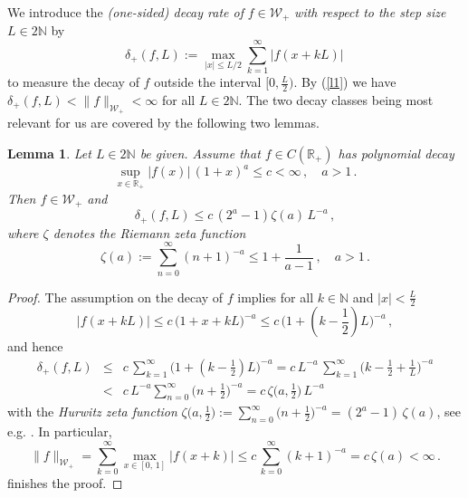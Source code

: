 \documentclass[11pt,a4paper]{scrartcl}
\newtheorem{lemma}[theorem]{Lemma}
\numberwithin{equation}{section}
\numberwithin{table}{section}
\numberwithin{figure}{section}
\newcommand{\N}{\mathbb N}
\newcommand{\Rp}{{\mathbb R}_{+}}
\newcommand{\Wp}{{\mathcal W}_{+}}
\newcommand{\dpl}{\delta_{+}}
\begin{document}
\noindent
We introduce
the \emph{(one-sided) decay rate of}  $f \in \Wp$
\emph{with respect to the step size} $L \in 2\N$ by
\begin{equation}
\label{eq:decayrate+}
\textstyle \dpl(f,L) := \max\limits_{|x| \leq L/2} \sum\limits_{k = 1}^{\infty} |f(x + k L)|\,
\end{equation}
to measure the decay of $f$ outside the interval $[0, \frac{L}{2})$.
By (\ref{l1}) we have $\dpl(f,L) < \|f\|_{\Wp} < \infty$ for all $L \in 2{\mathbb N}$.
The two decay
classes being most relevant for us are covered by the following two lemmas.

\begin{lemma}
	\label{Lemma:polydecay}
	Let $L \in 2\N$ be given. Assume that $f \in C(\Rp)$ has \emph{polynomial
	decay}
	$$
	\textstyle \sup\limits_{x \in \Rp} |f(x)|\,(1 + x)^a \leq c < \infty\,,
	\quad a > 1\,.
	$$
	Then $f \in \Wp$ and
	\begin{equation}
		\label{eq:deltapoly}
	\textstyle	\dpl(f,L) \leq c\,(2^a - 1)\zeta(a)\,L^{-a}\,,
	\end{equation}
	where $\zeta$ denotes the \emph{Riemann zeta function}
	$$
	\textstyle \zeta(a) := \sum\limits_{n=0}^{\infty} (n+1)^{-a} \leq 1 + \frac{1}{a-1}\,,
	\quad a > 1\,.
	$$
\end{lemma}

\begin{proof} The assumption on  the  decay of $f$ implies  for all $k \in \N$ and
$|x| < \frac{L}{2}$
$$
\textstyle \big|f(x + kL)\big| \leq c\,\big(1 + x + kL\big)^{-a}
\leq c\,\big(1 + (k - \frac{1}{2})L\big)^{-a}\,,
$$
and hence
\begin{eqnarray*}
	\dpl(f,L) &\leq&  \textstyle c\, \sum\limits_{k=1}^{\infty}
	\big(1 +  (k - \frac{1}{2}) L\big)^{-a} =
	c\,L^{-a}\,\sum\limits_{k=1}^{\infty} \big(k - \frac{1}{2} + \tfrac{1}{L}\big)^{-a} \\
	&<&  \textstyle c\,L^{-a}\sum\limits_{n=0}^{\infty} \big(n + \tfrac{1}{2}\big)^{-a}
	= c\,\zeta\big(a, \tfrac{1}{2}\big)\,L^{-a}
\end{eqnarray*}
with the \emph{Hurwitz zeta function} $\zeta\big(a, \frac{1}{2}\big) :=
\sum\limits_{n=0}^{\infty}\bigl(n + \frac{1}{2}\bigr)^{-a} = (2^a - 1)\,\zeta(a)$, see e.g.
\cite[Formula 25.11.11]{DLMF}.
In particular,
$$
\textstyle \| f\|_{\Wp} = \sum\limits_{k=0}^{\infty} \max\limits_{x\in [0,\,1]} |f(x+k)| \leq c\,\sum\limits_{k=0}^{\infty} (k+1)^{-a} = c\,\zeta(a) < \infty\,.
$$
finishes the proof. \end{proof}
\end{document}
